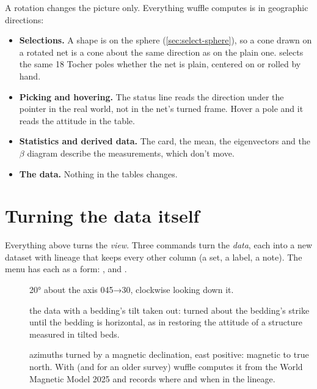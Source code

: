 A rotation changes the picture only. Everything wuffle computes is in geographic directions:

\begin{itemize}
\item \textbf{Selections.} A shape is on the sphere (\cref{sec:select-sphere}), so a cone drawn on a
rotated net is a cone about the same direction as on the plain one.  selects
the same 18 Tocher poles whether the net is plain, centered on  or rolled by hand.
\item \textbf{Picking and hovering.} The status line reads the direction under the pointer in the real
world, not in the net's turned frame. Hover a pole and it reads the attitude in the table.
\item \textbf{Statistics and derived data.} The card, the mean, the eigenvectors and the $\beta$ diagram
describe the measurements, which don't move.
\item \textbf{The data.} Nothing in the tables changes.
\end{itemize}

\section{Turning the data itself}\label{sec:turn}

Everything above turns the \emph{view}. Three commands turn the \emph{data}, each into a new dataset with
lineage that keeps every other column (a set, a label, a note). The  menu has each as a form:
,  and .

\begin{description}
\item[] 20° about the axis 045→30, clockwise looking down it.
\item[] the data with a bedding's tilt taken out: turned about the
bedding's strike until the bedding is horizontal, as in restoring the attitude of a structure measured in
tilted beds.
\item[] azimuths turned by a magnetic declination, east
positive: magnetic to true north. With  (and  for an older
survey) wuffle computes it from the World Magnetic Model 2025 and records where and when in the lineage.
\end{description}

